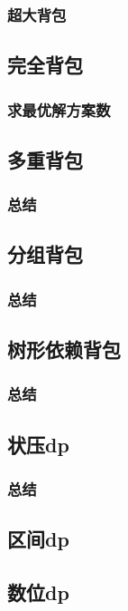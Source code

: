 \documentclass[10pt,a4paper]{article}
\begin{document}
\subsubsection{超大背包}

\subsection{完全背包}
\subsubsection{求最优解方案数}

\subsection{多重背包}
\subsubsection{总结}

\subsection{分组背包}
\subsubsection{总结}

\subsection{树形依赖背包}
\subsubsection{总结}

\subsection{状压dp}
\subsubsection{总结}

\subsection{区间dp}
\subsection{数位dp}
\end{document}
